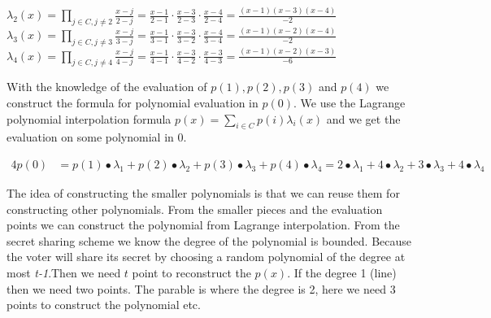 \begin{center}
\begin{math} \lambda_2(x)=\prod\limits_{j\in C,j\neq2} \frac{x-j}{2-j} = \frac{x-1}{2-1} \cdot \frac{x-3}{2-3} \cdot \frac{x-4}{2-4}=\frac{(x-1)(x-3)(x-4)}{-2} \end{math}\\ 

\begin{math} \lambda_3(x)=\prod\limits_{j\in C,j\neq3} \frac{x-j}{3-j} = \frac{x-1}{3-1} \cdot \frac{x-3}{3-2} \cdot \frac{x-4}{3-4}=\frac{(x-1)(x-2)(x-4)}{-2} \end{math}\\ 

\begin{math} \lambda_4(x)=\prod\limits_{j\in C,j\neq4} \frac{x-j}{4-j} = \frac{x-1}{4-1} \cdot \frac{x-3}{4-2} \cdot \frac{x-3}{4-3}=\frac{(x-1)(x-2)(x-3)}{-6} \end{math}\\ 
\end{center}

\noindent
With the knowledge of the evaluation of \begin{math}p(1), p(2), p(3)\end{math} and  \begin{math}p(4)\end{math} we construct the formula for polynomial evaluation in \begin{math}p(0)\end{math}. We use the Lagrange polynomial interpolation formula \begin{math}p(x)=\sum\limits_{i \in C} p(i)\lambda_i(x)\end{math} and we get the evaluation on some polynomial in $0$.


\noindent
\begin{alignat*}{4}
p(0) &=p(1)∙\lambda_1+p(2)∙\lambda_2+p(3)∙\lambda_3+p(4)∙\lambda_4=2∙\lambda_1+4∙\lambda_2+3∙\lambda_3+4∙\lambda_4  
\end{alignat*}



\noindent
The idea of constructing the smaller polynomials is that we can reuse them for constructing other polynomials. From the smaller pieces and the evaluation points we can construct the polynomial from Lagrange interpolation. From the secret sharing scheme we know the degree of the polynomial is bounded. Because the voter will share its secret by choosing a random polynomial of the degree at most \textit{t-1}.Then we need $t$ point to reconstruct the $p(x)$. If the degree 1 (line) then we need two points. The parable is where the degree is 2, here we need 3 points to construct
the polynomial etc.

